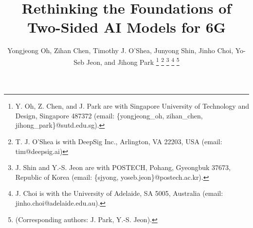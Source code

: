 \documentclass[10pt,twocolumn]{IEEEtran}
\begin{document}
\title{\fontsize{21}{28}\selectfont Rethinking the Foundations of Two-Sided AI Models for 6G
}

\author{Yongjeong Oh, Zihan Chen, Timothy J. O’Shea, Junyong Shin, Jinho Choi, Yo-Seb Jeon, and Jihong Park
        \thanks{Y. Oh, Z. Chen, and J. Park are with Singapore University of Technology and Design, Singapore 487372 (email: \{yongjeong\_oh, zihan\_chen, jihong\_park\}@sutd.edu.sg).} 
        \thanks{T. J. O’Shea is with DeepSig Inc., Arlington, VA 22203, USA (email: tim@deepsig.ai)} 
        \thanks{J. Shin and Y.-S. Jeon are with POSTECH, Pohang, Gyeongbuk 37673, Republic of Korea (email: \{sjyong, yoseb.jeon\}@postech.ac.kr).} 
        \thanks{J. Choi is with the University of Adelaide, SA 5005, Australia (email: jinho.choi@adelaide.edu.au).} 
        \thanks{(Corresponding authors: J. Park, Y.-S. Jeon).}
        \vspace{1mm}}
	\vspace{-2mm} 


\maketitle
\end{document}
